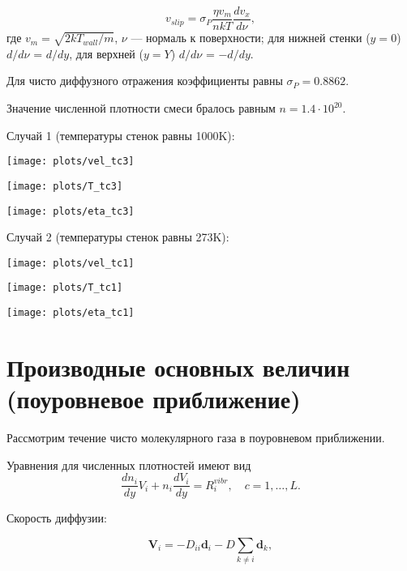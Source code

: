 \documentclass[12pt]{article}
\begin{document}
\begin{equation}
  v_{slip} = \sigma_{P} \frac{\eta v_{m}}{nkT}\frac{d v_{x}}{d \nu},
\end{equation}
где $v_{m} = \sqrt{2kT_{wall} / m}$, $\nu$ --- нормаль к поверхности; для нижней стенки ($y=0$) $d / d \nu$ = $d / d y$, для верхней ($y=Y$) $d / d \nu$ = $-d / d y$.

Для чисто диффузного отражения коэффициенты равны $\sigma_{P} = 0.8862$.

Значение численной плотности смеси бралось равным $n=1.4 \cdot 10^{20}$.

Случай 1 (температуры стенок равны 1000K):
\begin{center}
\texttt{[image: plots/vel\_tc3]}
\end{center}
\begin{center}
\texttt{[image: plots/T\_tc3]}
\end{center}
\begin{center}
\texttt{[image: plots/eta\_tc3]}
\end{center}

Случай 2 (температуры стенок равны 273K):
\begin{center}
\texttt{[image: plots/vel\_tc1]}
\end{center}
\begin{center}
\texttt{[image: plots/T\_tc1]}
\end{center}
\begin{center}
\texttt{[image: plots/eta\_tc1]}
\end{center}

\section{Производные основных величин (поуровневое приближение)}
Рассмотрим течение чисто молекулярного газа в поуровневом приближении.

Уравнения для численных плотностей имеют вид
\begin{equation}
  \frac{d n_{i}}{d y} V_{i} + n_{i}\frac{d V_{i}}{d y} = R_{i}^{vibr},\quad c=1,\ldots,L.\label{densityeqn-sts}
\end{equation}

Скорость диффузии:

\begin{equation}
   \mathbf{V}_{i} = -D_{ii}\mathbf{d}_{i} -D \sum_{k \neq i}\mathbf{d}_{k},
\end{equation}
\end{document}
